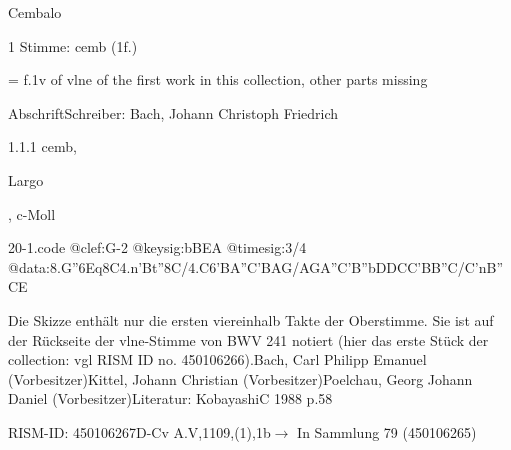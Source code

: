 \documentclass[a4paper, twocolumn, 11pt]{book}
\begin{document}
\par \begin{itshape} Cembalo\end{itshape} 
\par \textcolor{darkblue}{}  1 Stimme: cemb  (1f.)\newline \begin{small} = f.1v of vlne of the first work in this collection, other parts missing\end{small} \newline Abschrift\newline Schreiber: Bach, Johann Christoph Friedrich
\par 1.1.1  cemb, \begin{itshape}Largo\end{itshape}, c-Moll  
\begin{filecontents*}{20-1.code}
@clef:G-2
@keysig:bBEA
@timesig:3/4
@data:{8.G''6E}q8C4.n'Bt''8C/4.C6{'BA}{''C'BAG}/{AGA''C}{'B''bDDC}{C'BB''C}/{C'nB''CE}
\end{filecontents*}
\newline %
\par Die Skizze enthält nur die ersten viereinhalb Takte der Oberstimme. Sie ist auf der Rückseite der vlne-Stimme von BWV 241 notiert (hier das erste Stück der {\textquotedbl}collection{\textquotedbl}: vgl RISM ID no. 450106266).\newline Bach, Carl Philipp Emanuel  (Vorbesitzer)\newline Kittel, Johann Christian  (Vorbesitzer)\newline Poelchau, Georg Johann Daniel  (Vorbesitzer)\newline Literatur: KobayashiC 1988  p.58
\par RISM-ID: 450106267\newline D-Cv  A.V,1109,(1),1b\newline $\rightarrow$ In Sammlung 79 (450106265)
      
\end{document}
